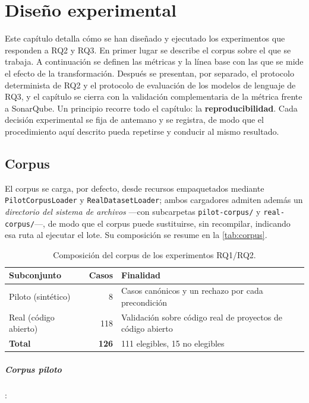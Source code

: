 
\chapter{Diseño experimental}
\label{sec:experimento}

Este capítulo detalla cómo se han diseñado y ejecutado los experimentos que
responden a RQ2 y RQ3. En primer lugar se describe el corpus sobre el que se
trabaja. A continuación se definen las métricas y la línea base con las que se
mide el efecto de la transformación. Después se presentan, por separado, el
protocolo determinista de RQ2 y el protocolo de evaluación de los modelos de
lenguaje de RQ3, y el capítulo se cierra con la validación complementaria de la
métrica frente a SonarQube. Un principio recorre todo el capítulo: la
\textbf{reproducibilidad}. Cada decisión experimental se fija de antemano y se
registra, de modo que el procedimiento aquí descrito pueda repetirse y conducir
al mismo resultado.

\section{Corpus}
\label{sec:corpus}
El corpus se carga, por defecto, desde recursos empaquetados mediante
\texttt{PilotCorpusLoader} y \texttt{RealDatasetLoader}; ambos cargadores
admiten además un \emph{directorio del sistema de archivos} ---con subcarpetas
\texttt{pilot-corpus/} y \texttt{real-corpus/}---, de modo que el corpus puede
sustituirse, sin recompilar, indicando esa ruta al ejecutar el lote. Su
composición se resume en la \autoref{tab:corpus}.

\begin{table}[ht]
\centering
\caption{Composición del corpus de los experimentos RQ1/RQ2.}
\label{tab:corpus}
\begin{tabular}{@{}lrl@{}}
\toprule
\textbf{Subconjunto} & \textbf{Casos} & \textbf{Finalidad} \\
\midrule
Piloto (sintético) & 8   & Casos canónicos y un rechazo por cada precondición \\
Real (código abierto) & 118 & Validación sobre código real de proyectos de código abierto \\
\midrule
\textbf{Total} & \textbf{126} & 111 elegibles, 15 no elegibles \\
\bottomrule
\end{tabular}
\end{table}

\paragraph{Corpus piloto}:

